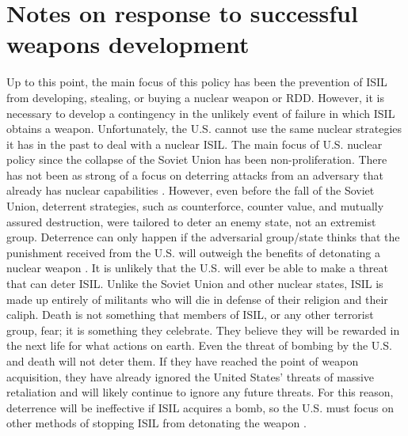 \documentclass{report}
\begin{document}
\chapter{Notes on response to successful weapons development}

Up to this point, the main focus of this policy has been the prevention of ISIL from developing, stealing, or buying a nuclear weapon or RDD.  However, it is necessary to develop a contingency in the unlikely event of failure in which ISIL obtains a weapon.  Unfortunately, the U.S. cannot use the same nuclear strategies it has in the past to deal with a nuclear ISIL.  The main focus of U.S. nuclear policy since the collapse of the Soviet Union has been non-proliferation.  There has not been as strong of a focus on deterring attacks from an adversary that already has nuclear capabilities \cite{Bracken2013}. However, even before the fall of the Soviet Union, deterrent strategies, such as counterforce, counter value, and mutually assured destruction, were tailored to deter an enemy state, not an extremist group.  Deterrence can only happen if the adversarial group/state thinks that the punishment received from the U.S. will outweigh the benefits of detonating a nuclear weapon \cite{kaplan1991wizards}.  It is unlikely that the U.S. will ever be able to make a threat that can deter ISIL.  Unlike the Soviet Union and other nuclear states, ISIL is made up entirely of militants who will die in defense of their religion and their caliph.  Death is not something that members of ISIL, or any other terrorist group, fear; it is something they celebrate.  They believe they will be rewarded in the next life for what actions on earth.  Even the threat of bombing by the U.S. and death will not deter them.  If they have reached the point of weapon acquisition, they have already ignored the United States' threats of massive retaliation and will likely continue to ignore any future threats.  For this reason, deterrence will be ineffective if ISIL acquires a bomb, so the U.S. must focus on other methods of stopping ISIL from detonating the weapon \cite{Sanderson2015}.
\end{document}
